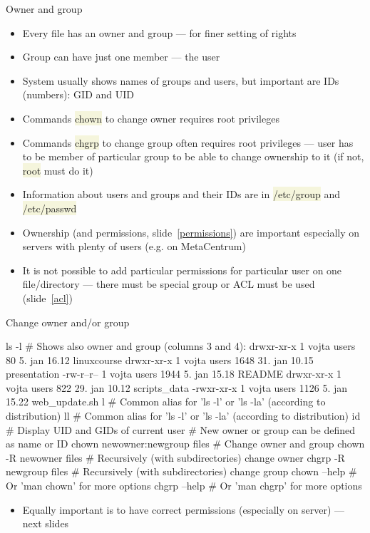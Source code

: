 \documentclass[compress, ucs, xelatex, 11pt, xcolor=svgnames, aspectratio=169,
	hyperref={
		bookmarks=true,
		unicode=true,
		colorlinks=true,
		pdftitle={Linux, command line and MetaCentrum},
		plainpages=false,
		pdfauthor={Vojtech Zeisek},
		pdfsubject={Course about use of Linux command line, writing shell scripts and using MetaCentrum of CESNET},
		pdfcreator={XeLaTeX},
		pdfkeywords={Linux, GNU, BASH, shell, command line, MetaCentrum},
		linkcolor=DarkRed, %
		anchorcolor=DarkBlue, %
		citecolor=Indigo, %
		filecolor=NavyBlue, %
		menucolor=DarkMagenta, %
		urlcolor=DarkBlue, %
		pdftex},
	url={hyphens, lowtilde} %
	]{beamer}
\renewcommand{\texttt}[1]{\colorbox{Beige}{{\ttfamily #1}}}
\begin{document}
\begin{frame}{Owner and group}
	\begin{itemize}
		\item Every file has an owner and group --- for finer setting of rights
		\item Group can have just one member --- the user
		\item System usually shows names of groups and users, but important are IDs (numbers): GID and UID
		\item Commands \texttt{chown} to change owner requires root privileges
		\item Commands \texttt{chgrp} to change group often requires root privileges --- user has to be member of particular group to be able to change ownership to it (if not, \texttt{root} must do it)
		\item Information about users and groups and their IDs are in \texttt{/etc/group} and \texttt{/etc/passwd}
		\item Ownership (and permissions, slide~\ref{permissions}) are important especially on servers with plenty of users (e.g. on MetaCentrum)
		\item It is not possible to add particular permissions for particular user on one file/directory --- there must be special group or ACL must be used (slide~\ref{acl})
	\end{itemize}
\end{frame}

\begin{frame}[fragile]{Change owner and/or group}
	\begin{bashcode}
    ls -l # Shows also owner and group (columns 3 and 4):
    drwxr-xr-x 1 vojta users    80  5. jan 16.12 linuxcourse
    drwxr-xr-x 1 vojta users  1648 31. jan 10.15 presentation
    -rw-r--r-- 1 vojta users  1944  5. jan 15.18 README
    drwxr-xr-x 1 vojta users   822 29. jan 10.12 scripts_data
    -rwxr-xr-x 1 vojta users  1126  5. jan 15.22 web_update.sh
    l # Common alias for 'ls -l' or 'ls -la' (according to distribution)
    ll # Common alias for 'ls -l' or 'ls -la' (according to distribution)
    id # Display UID and GIDs of current user
    # New owner or group can be defined as name or ID
    chown newowner:newgroup files # Change owner and group
    chown -R newowner files # Recursively (with subdirectories) change owner
    chgrp -R newgroup files # Recursively (with subdirectories) change group
    chown --help # Or 'man chown' for more options
    chgrp --help # Or 'man chgrp' for more options
	\end{bashcode}
	\begin{itemize}
		\item Equally important is to have correct permissions (especially on server) --- next slides
	\end{itemize}
\end{frame}
\end{document}
